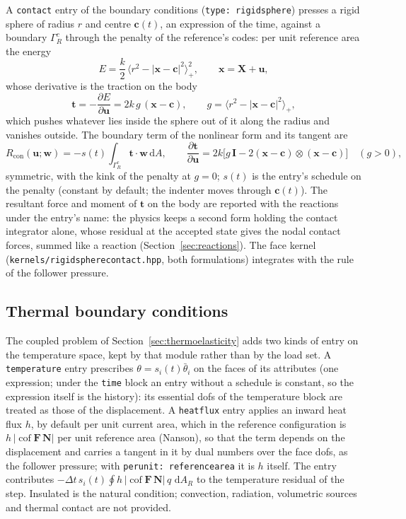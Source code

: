 \documentclass[11pt]{article}
\newcommand{\ud}{\,\mathrm{d}}
\newcommand{\cof}{\operatorname{cof}}
\newcommand{\bx}{\bm{x}}
\newcommand{\bX}{\bm{X}}
\newcommand{\bu}{\bm{u}}
\newcommand{\bw}{\bm{w}}
\newcommand{\bN}{\bm{N}}
\newcommand{\bt}{\bm{t}}
\newcommand{\bF}{\bm{F}}
\newcommand{\bI}{\bm{I}}
\DeclareRobustCommand{\code}[1]{{\def\_{\textunderscore\allowbreak}\texttt{#1}}}
\DeclareRobustCommand{\file}[1]{{\def\_{\textunderscore\allowbreak}\texttt{#1}}}
\begin{document}
A \code{contact} entry of the boundary conditions (\code{type:
rigid\_sphere}) presses a rigid sphere of radius $r$ and centre $\bm c(t)$,
an expression of the time, against a boundary $\Gamma_R^c$ through the
penalty of the reference's codes: per unit reference area the energy
\begin{equation}
  E = \frac{k}{2}\,\bigl\langle r^2 - |\bx - \bm c|^2\bigr\rangle_+^2, \qquad \bx = \bX + \bu,
\end{equation}
whose derivative is the traction on the body
\begin{equation}
  \bt = -\frac{\partial E}{\partial\bu} = 2k\,g\,(\bx - \bm c), \qquad
  g = \bigl\langle r^2 - |\bx - \bm c|^2\bigr\rangle_+ ,
\end{equation}
which pushes whatever lies inside the sphere out of it along the radius
and vanishes outside.  The boundary term of the nonlinear form and its
tangent are
\begin{equation}
  R_{\text{con}}(\bu; \bw) = -s(t)\int_{\Gamma_R^c}\bt\cdot\bw\ud A, \qquad
  \frac{\partial\bt}{\partial\bu} = 2k\bigl[g\,\bI - 2(\bx - \bm c)\otimes(\bx - \bm c)\bigr] \quad (g > 0),
\end{equation}
symmetric, with the kink of the penalty at $g = 0$; $s(t)$ is the entry's
schedule on the penalty (constant by default; the indenter moves through
$\bm c(t)$).  The resultant force and moment of $\bt$ on the body are
reported with the reactions under the entry's name: the physics keeps a
second form holding the contact integrator alone, whose residual at the
accepted state gives the nodal contact forces, summed like a reaction
(Section~\ref{sec:reactions}).  The face kernel
(\file{kernels/rigid\_sphere\_contact.hpp}, both formulations) integrates
with the rule of the follower pressure.

\subsection{Thermal boundary conditions}
\label{sec:thermalbcs}

The coupled problem of Section~\ref{sec:thermoelasticity} adds two kinds of
entry on the temperature space, kept by that module rather than by the load
set.  A \code{temperature} entry prescribes $\theta = s_i(t)\bar\theta_i$ on
the faces of its attributes (one expression; under the \code{time} block an
entry without a schedule is constant, so the expression itself is the
history): its essential dofs of the temperature block are treated as those
of the displacement.  A \code{heat\_flux} entry applies an inward heat flux
$h$, by default per unit current area, which in the reference configuration
is $h\,|\cof\bF\,\bN|$ per unit reference area (Nanson), so that the term
depends on the displacement and carries a tangent in it by dual numbers over
the face dofs, as the follower pressure; with \code{per\_unit:
reference\_area} it is $h$ itself.  The entry contributes
$-\Delta t\,s_i(t)\oint h\,|\cof\bF\,\bN|\,q\,\ud A_R$ to the temperature
residual of the step.  Insulated is the natural condition; convection,
radiation, volumetric sources and thermal contact are not provided.
\end{document}
